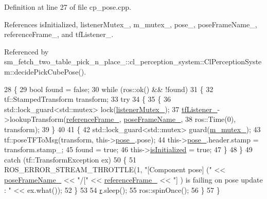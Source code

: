 Definition at line 27 of file cp\+\_\+pose.\+cpp.



References is\+Initialized, listener\+Mutex\+\_\+, m\+\_\+mutex\+\_\+, pose\+\_\+, pose\+Frame\+Name\+\_\+, reference\+Frame\+\_\+, and tf\+Listener\+\_\+.



Referenced by sm\+\_\+fetch\+\_\+two\+\_\+table\+\_\+pick\+\_\+n\+\_\+place\+\_\+::cl\+\_\+perception\+\_\+system\+::\+Cl\+Perception\+System\+::decide\+Pick\+Cube\+Pose().


\begin{DoxyCode}
28     \{
29         \textcolor{keywordtype}{bool} found = \textcolor{keyword}{false};
30         \textcolor{keywordflow}{while} (ros::ok() && !found)
31         \{
32             tf::StampedTransform transform;
33             \textcolor{keywordflow}{try}
34             \{
35                 \{
36                     std::lock\_guard<std::mutex> lock(\hyperlink{classcl__move__base__z_1_1Pose_ae1b5ee53f49d74926e04a477d792f1d0}{listenerMutex\_});
37                     \hyperlink{classcl__move__base__z_1_1Pose_a188a5ac62d5424c1eacd667868049962}{tfListener\_}->lookupTransform(\hyperlink{classcl__move__base__z_1_1Pose_a6a7a593232b6edaf99103d48ad8da9d3}{referenceFrame\_}, 
      \hyperlink{classcl__move__base__z_1_1Pose_a4f45be8e2fd73e618d815582a4ca8efe}{poseFrameName\_},
38                                                       ros::Time(0), transform);
39                 \}
40 
41                 \{
42                     std::lock\_guard<std::mutex> guard(\hyperlink{classcl__move__base__z_1_1Pose_a73ed2daba3e473e156cab751fb37b58f}{m\_mutex\_});
43                     tf::poseTFToMsg(transform, this->\hyperlink{classcl__move__base__z_1_1Pose_a9da7acf880968a3c220b8436fd0bb6ef}{pose\_}.pose);
44                     this->\hyperlink{classcl__move__base__z_1_1Pose_a9da7acf880968a3c220b8436fd0bb6ef}{pose\_}.header.stamp = transform.stamp\_;
45                     found = \textcolor{keyword}{true};
46                     this->\hyperlink{classcl__move__base__z_1_1Pose_a49df3a978021edb71a48ef5e6d8e75a8}{isInitialized} = \textcolor{keyword}{true};
47                 \}
48             \}
49             \textcolor{keywordflow}{catch} (tf::TransformException ex)
50             \{
51                 ROS\_ERROR\_STREAM\_THROTTLE(1, \textcolor{stringliteral}{"[Component pose] ("} << 
      \hyperlink{classcl__move__base__z_1_1Pose_a4f45be8e2fd73e618d815582a4ca8efe}{poseFrameName\_} << \textcolor{stringliteral}{"/["} << \hyperlink{classcl__move__base__z_1_1Pose_a6a7a593232b6edaf99103d48ad8da9d3}{referenceFrame\_} << \textcolor{stringliteral}{"] ) is failing on pose update : 
      "} << ex.what());
52             \}
53 
54             \hyperlink{namespacefake__cube__perception__node_a36e88703ab69fd35065e8a8d9344903e}{r}.sleep();
55             ros::spinOnce();
56         \}
57     \}
\end{DoxyCode}

